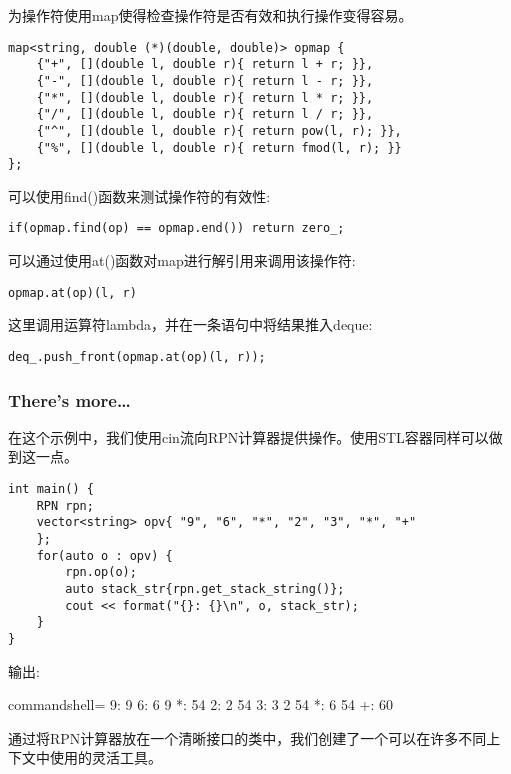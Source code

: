 为操作符使用map使得检查操作符是否有效和执行操作变得容易。

\begin{lstlisting}[style=styleCXX]
map<string, double (*)(double, double)> opmap {
	{"+", [](double l, double r){ return l + r; }},
	{"-", [](double l, double r){ return l - r; }},
	{"*", [](double l, double r){ return l * r; }},
	{"/", [](double l, double r){ return l / r; }},
	{"^", [](double l, double r){ return pow(l, r); }},
	{"%", [](double l, double r){ return fmod(l, r); }}
};
\end{lstlisting}

可以使用find()函数来测试操作符的有效性:

\begin{lstlisting}[style=styleCXX]
if(opmap.find(op) == opmap.end()) return zero_;
\end{lstlisting}

可以通过使用at()函数对map进行解引用来调用该操作符:

\begin{lstlisting}[style=styleCXX]
opmap.at(op)(l, r)
\end{lstlisting}

这里调用运算符lambda，并在一条语句中将结果推入deque:

\begin{lstlisting}[style=styleCXX]
deq_.push_front(opmap.at(op)(l, r));
\end{lstlisting}

\subsubsection{There's more…}

在这个示例中，我们使用cin流向RPN计算器提供操作。使用STL容器同样可以做到这一点。

\begin{lstlisting}[style=styleCXX]
int main() {
	RPN rpn;
	vector<string> opv{ "9", "6", "*", "2", "3", "*", "+"
	};
	for(auto o : opv) {
		rpn.op(o);
		auto stack_str{rpn.get_stack_string()};
		cout << format("{}: {}\n", o, stack_str);
	}
}
\end{lstlisting}

输出:

\begin{tcblisting}{commandshell={}}
9: 9
6: 6 9
*: 54
2: 2 54
3: 3 2 54
*: 6 54
+: 60
\end{tcblisting}

通过将RPN计算器放在一个清晰接口的类中，我们创建了一个可以在许多不同上下文中使用的灵活工具。







